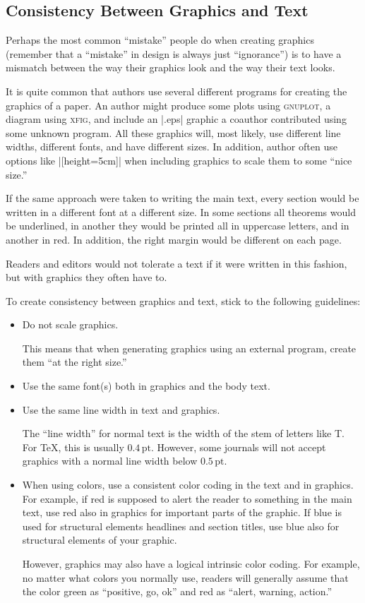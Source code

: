 \subsection{Consistency Between Graphics and Text}

Perhaps the most common ``mistake'' people do when creating graphics
(remember that a ``mistake'' in design is always just ``ignorance'')
is to have a mismatch between the way their graphics look and the way 
their text looks.

It is quite common that authors use several different programs for
creating the graphics of a paper. An author might produce some plots
using \textsc{gnuplot}, a diagram using \textsc{xfig}, and include an
|.eps| graphic a coauthor contributed using some unknown program. All
these graphics will, most likely, use different line widths, different
fonts, and have different sizes. In addition, author often use
options like |[height=5cm]| when including graphics to scale them to
some ``nice size.''

If the same approach were taken to writing the main text, every
section would be written in a different font at a different size. In
some sections all theorems would be underlined, in another they would
be printed all in uppercase letters, and in another in red. In
addition, the right margin would be different on each page.

Readers and editors would not tolerate a text if it were written in
this fashion, but with graphics they often have to.

To create consistency between graphics and text, stick to the
following guidelines:
\begin{itemize}
\item
  Do not scale graphics.

  This means that when generating graphics using an external program,
  create them ``at the right size.''
\item
  Use the same font(s) both in graphics and the body text.
\item
  Use the same line width in text and graphics.

  The  ``line width'' for normal text is the width of the stem of
  letters like T{}. For \TeX, this is usually
  $0.4\,\mathrm{pt}$. However, some journals will not accept graphics
  with a normal line width below $0.5\,\mathrm{pt}$.
\item
  When using colors, use a consistent color coding in the text and in  
  graphics. For example, if red is supposed to alert the reader to
  something in the main text, use red also in graphics for important
  parts of the graphic. If blue is used for structural elements
  headlines and section titles, use blue also for structural elements
  of your graphic.

  However, graphics may also have a logical intrinsic color
  coding. For example, no matter what colors you normally use, readers
  will generally assume that the color green as ``positive, go, ok''
  and red as ``alert, warning, action.''
\end{itemize}

